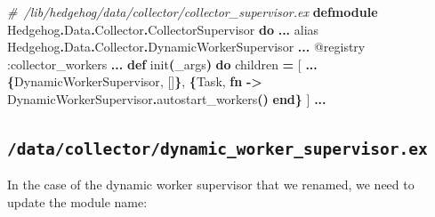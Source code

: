 \documentclass[
  oneside]{book}
\newenvironment{Shaded}{\begin{snugshade}}{\end{snugshade}}
\newcommand{\CommentTok}[1]{\textcolor[rgb]{0.56,0.35,0.01}{\textit{#1}}}
\newcommand{\ConstantTok}[1]{\textcolor[rgb]{0.56,0.35,0.01}{#1}}
\newcommand{\FunctionTok}[1]{\textcolor[rgb]{0.13,0.29,0.53}{\textbf{#1}}}
\newcommand{\ImportTok}[1]{#1}
\newcommand{\KeywordTok}[1]{\textcolor[rgb]{0.13,0.29,0.53}{\textbf{#1}}}
\newcommand{\NormalTok}[1]{#1}
\newcommand{\OperatorTok}[1]{\textcolor[rgb]{0.81,0.36,0.00}{\textbf{#1}}}
\newcommand{\OtherTok}[1]{\textcolor[rgb]{0.56,0.35,0.01}{#1}}
\newcommand{\VariableTok}[1]{\textcolor[rgb]{0.00,0.00,0.00}{#1}}
\begin{document}
\begin{Shaded}
\begin{Highlighting}[]
\CommentTok{\# /lib/hedgehog/data/collector/collector\_supervisor.ex}
\KeywordTok{defmodule} \ConstantTok{Hedgehog}\OperatorTok{.}\ConstantTok{Data}\OperatorTok{.}\ConstantTok{Collector}\OperatorTok{.}\ConstantTok{CollectorSupervisor} \KeywordTok{do}
\OperatorTok{...}
  \ImportTok{alias} \ConstantTok{Hedgehog}\OperatorTok{.}\ConstantTok{Data}\OperatorTok{.}\ConstantTok{Collector}\OperatorTok{.}\ConstantTok{DynamicWorkerSupervisor}
\OperatorTok{...}
  \OtherTok{@registry} \VariableTok{:collector\_workers}
\OperatorTok{...}
  \KeywordTok{def}\NormalTok{ init}\FunctionTok{(}\NormalTok{\_args}\FunctionTok{)} \KeywordTok{do}
\NormalTok{    children }\OperatorTok{=} \OtherTok{[}
      \OperatorTok{...}
      \FunctionTok{\{}\ConstantTok{DynamicWorkerSupervisor}\NormalTok{, }\OtherTok{[]}\FunctionTok{\}}\NormalTok{,}
      \FunctionTok{\{}\ConstantTok{Task}\NormalTok{,}
        \KeywordTok{fn} \OperatorTok{{-}\textgreater{}}
          \ConstantTok{DynamicWorkerSupervisor}\OperatorTok{.}\NormalTok{autostart\_workers}\FunctionTok{()}
        \KeywordTok{end}\FunctionTok{\}}
     \OtherTok{]}
    \OperatorTok{...}
\end{Highlighting}
\end{Shaded}

\subsection{\texorpdfstring{\texttt{/data/collector/dynamic\_worker\_supervisor.ex}}{/data/collector/dynamic\_worker\_supervisor.ex}}\label{datacollectordynamic_worker_supervisor.ex}

In the case of the dynamic worker supervisor that we renamed, we need to update the module name:
\end{document}
